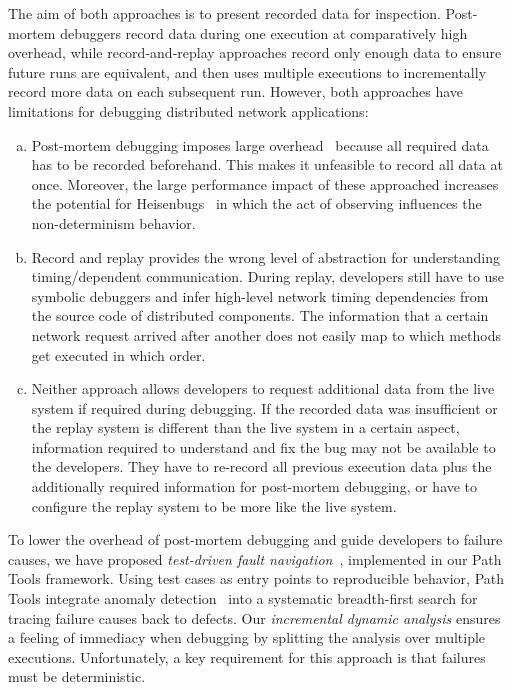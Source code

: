 \documentclass[preprint,3p]{elsarticle}
\begin{document}
The aim of both approaches is to present recorded data for
inspection. Post-mortem debuggers record data during one execution at
comparatively high overhead, while record-and-replay approaches record only
enough data to ensure future runs are equivalent, and then uses multiple
executions to incrementally record more data on each subsequent run. However,
both approaches have limitations for debugging distributed network applications:

\begin{enumerate}[(a)]
\item Post-mortem debugging imposes large overhead~\cite{Stanley2009}
  because all required data has to be recorded beforehand. This makes
  it unfeasible to record all data at once. Moreover, the large
  performance impact of these approached increases the potential for
  Heisenbugs~\cite{zeller2009programs} in which the act of observing
  influences the non-determinism behavior.
\item Record and replay provides the wrong level of abstraction for
  understanding timing\-/dependent communication. During replay,
  developers still have to use symbolic debuggers and infer high-level
  network timing dependencies from the source code of distributed
  components. The information that a certain network request arrived
  after another does not easily map to which methods get executed in
  which order.
\item Neither approach allows developers to request additional data
  from the live system if required during debugging. If the recorded
  data was insufficient or the replay system is different than the
  live system in a certain aspect, information required to understand
  and fix the bug may not be available to the developers. They have to
  re-record all previous execution data plus the additionally required
  information for post-mortem debugging, or have to configure the
  replay system to be more like the live system.
\end{enumerate}

To lower the overhead of post-mortem debugging and guide developers to failure
causes, we have proposed \emph{test-driven fault navigation}~\cite{Perscheid13},
implemented in our Path Tools framework. Using test cases as entry points to
reproducible behavior, Path Tools integrate anomaly
detection~\cite{Jones2002Vti,Ernst2007Tds} into a systematic breadth-first
search for tracing failure causes back to defects. Our \emph{incremental dynamic
  analysis} ensures a feeling of immediacy when debugging by splitting the
analysis over multiple executions. Unfortunately, a key requirement for this
approach is that failures must be deterministic.
\end{document}
